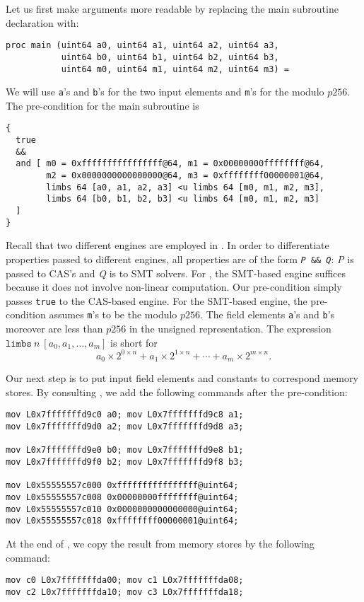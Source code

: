 \documentclass{amsproc}
\begin{document}
Let us first make arguments more readable by replacing the main
subroutine declaration with:
\begin{verbatim}
proc main (uint64 a0, uint64 a1, uint64 a2, uint64 a3,
           uint64 b0, uint64 b1, uint64 b2, uint64 b3,
           uint64 m0, uint64 m1, uint64 m2, uint64 m3) =
\end{verbatim}
We will use \texttt{a}'s and \texttt{b}'s for the two input elements
and \texttt{m}'s for the modulo $p256$. The pre-condition for the main
subroutine is
\begin{verbatim}
{
  true
  &&
  and [ m0 = 0xffffffffffffffff@64, m1 = 0x00000000ffffffff@64,
        m2 = 0x0000000000000000@64, m3 = 0xffffffff00000001@64,
        limbs 64 [a0, a1, a2, a3] <u limbs 64 [m0, m1, m2, m3],
        limbs 64 [b0, b1, b2, b3] <u limbs 64 [m0, m1, m2, m3]
  ]
}
\end{verbatim}
Recall that two different engines are employed in \cryptoline. In
order to differentiate properties passed to different engines, all
\cryptoline properties are of the form \texttt{\textit{P} \&\&
\textit{Q}}: \textit{P} is passed to CAS's and \textit{Q} is to SMT
solvers. For \nistzadd, the SMT-based engine suffices because it does
not involve non-linear computation. Our pre-condition simply passes
\texttt{true} to the CAS-based engine. For the SMT-based engine, the
pre-condition assumes \texttt{m}'s to be the modulo $p256$. The field
elements \texttt{a}'s and \texttt{b}'s moreover are less than $p256$
in the unsigned representation. The expression $\mathtt{limbs}\ n\
[a_0, a_1, \ldots, a_m]$ is short for
\[
  a_0\times 2^{0\times n}+a_1\times 2^{1\times n}+\cdots+a_m\times
  2^{m\times n}.
\]

Our next step is to put input field elements and constants to
correspond memory stores. By consulting \nistzaddgas, we add the
following \cryptoline commands after the pre-condition:
\begin{verbatim}
mov L0x7fffffffd9c0 a0; mov L0x7fffffffd9c8 a1;
mov L0x7fffffffd9d0 a2; mov L0x7fffffffd9d8 a3;

mov L0x7fffffffd9e0 b0; mov L0x7fffffffd9e8 b1;
mov L0x7fffffffd9f0 b2; mov L0x7fffffffd9f8 b3;

mov L0x55555557c000 0xffffffffffffffff@uint64;
mov L0x55555557c008 0x00000000ffffffff@uint64;
mov L0x55555557c010 0x0000000000000000@uint64;
mov L0x55555557c018 0xffffffff00000001@uint64;
\end{verbatim}

At the end of \nistzaddcl, we copy the result from memory stores by
the following command:
\begin{verbatim}
mov c0 L0x7fffffffda00; mov c1 L0x7fffffffda08;
mov c2 L0x7fffffffda10; mov c3 L0x7fffffffda18;
\end{verbatim}
\end{document}
